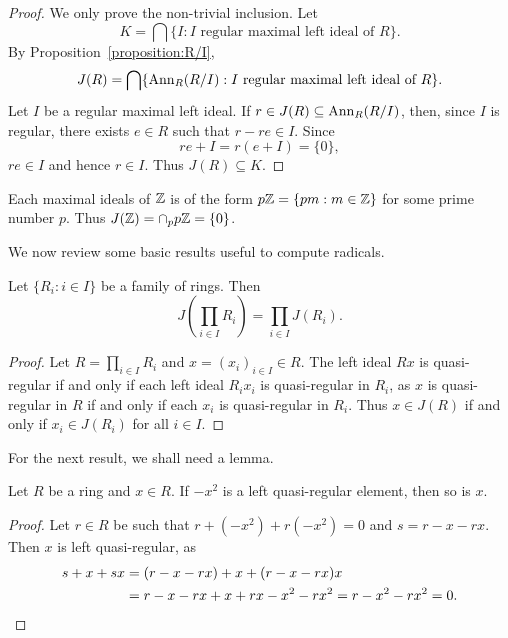 \begin{proof}
    We only prove the non-trivial inclusion. 
	Let 
	\[
	K=\bigcap\{I:\text{$I$ regular maximal left ideal of $R$}\}.
	\]
	By
	Proposition~\ref{proposition:R/I}, 
	\[
		J(R)=\bigcap\{\operatorname{Ann}_R(R/I):I\text{ regular maximal left ideal of $R$}\}.
	\]
	Let $I$ be a regular maximal left ideal. If $r\in J(R)\subseteq
	\operatorname{Ann}_R(R/I)$, then, since $I$ is regular, there exists $e\in R$ such that
	$r-re\in I$. Since 
	\[
	re+I=r(e+I)=\{0\},
	\]
	$re\in I$ and hence $r\in I$. Thus $J(R)\subseteq K$. 
\end{proof}

\begin{example}
	Each maximal ideals of $\mathbb{Z}$ is of the form $p\mathbb{Z}=\{pm:m\in\mathbb{Z}\}$ for some prime number $p$. 
	Thus $J(\mathbb{Z})=\cap_p p\mathbb{Z}=\{0\}$.
\end{example}




We now review some basic results useful to compute radicals. 

\begin{proposition}
	Let $\{R_i:i\in I\}$ be a family of rings. Then 
	\[
	J\left(\prod_{i\in I}R_i\right)=\prod_{i\in I}J(R_i).
	\]
\end{proposition}

\begin{proof}
	Let $R=\prod_{i\in I}R_i$ and $x=(x_i)_{i\in I}\in R$.  The left ideal 
    $Rx$ is quasi-regular if and only if each left ideal $R_ix_i$
	is quasi-regular in $R_i$, as $x$ is quasi-regular in $R$ if and only if each 
	$x_i$ is quasi-regular in $R_i$. Thus $x\in J(R)$ if and only if $x_i\in
	J(R_i)$ for all $i\in I$.
\end{proof}

For the next result, we shall need a lemma.

\begin{lemma}
	\label{lemma:trickJ1}
	Let $R$ be a ring and $x\in R$. 
	If $-x^2$ is a left quasi-regular element, then so is $x$. 
\end{lemma}

\begin{proof}
	Let $r\in R$ be such that $r+(-x^2)+r(-x^2)=0$ and $s=r-x-rx$. Then
    $x$ is left quasi-regular, as 
    \begin{align*}
		s+x+sx&=(r-x-rx)+x+(r-x-rx)x\\
		&=r-x-rx+x+rx-x^2-rx^2=r-x^2-rx^2=0.\qedhere 
\end{align*}
\end{proof}

